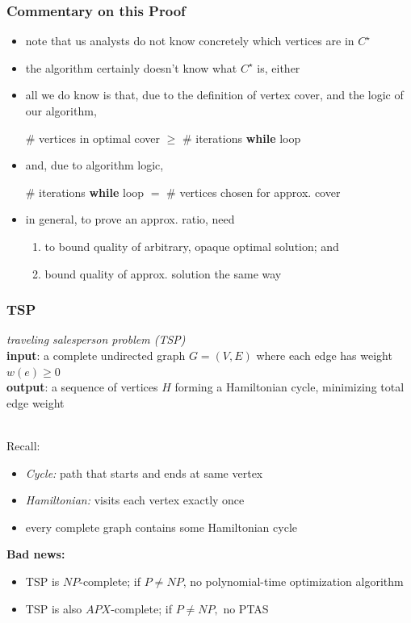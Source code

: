 \documentclass{beamer}
\newcommand{\stanza}{ \\~\ }
\begin{document}
\begin{frame} \frametitle{Commentary on this Proof}
\begin{itemize}
  \item note that us analysts do not know concretely which vertices are in $C^\star$
  \item the algorithm certainly doesn't know what $C^\star$ is, either
  \item all we do know is that, due to the definition of vertex cover, and
    the logic of our algorithm,
    \begin{center}
      \# vertices in optimal cover $\geq$ \# iterations \textbf{while} loop
    \end{center}
  \item and, due to algorithm logic,
  \begin{center}
      \# iterations \textbf{while} loop $=$ \# vertices chosen for approx. cover
  \end{center}
  \item in general, to prove an approx. ratio, need
  \begin{enumerate}
    \item to bound quality of arbitrary, opaque optimal solution; and
    \item bound quality of approx. solution the same way
  \end{enumerate}
\end{itemize}
\end{frame}

\begin{frame} \frametitle{TSP}
\emph{traveling salesperson problem (TSP)} \\
\textbf{input}: a complete undirected graph $G=(V,E)$ where each edge has weight $w(e) \geq 0$ \\
\textbf{output}: a sequence of vertices $H$ forming a Hamiltonian cycle, minimizing
total edge weight
\stanza

Recall:
\begin{itemize}
  \item \emph{Cycle:} path that starts and ends at same vertex
  \item \emph{Hamiltonian:} visits each vertex exactly once
  \item every complete graph contains some Hamiltonian cycle
\end{itemize}

\textbf{Bad news:}
\begin{itemize}
  \item TSP is $NP$-complete; if $P \ne NP$, no polynomial-time optimization algorithm
  \item TSP is also $APX$-complete; if $P \ne NP,$ no PTAS
\end{itemize}
\end{frame}
\end{document}
